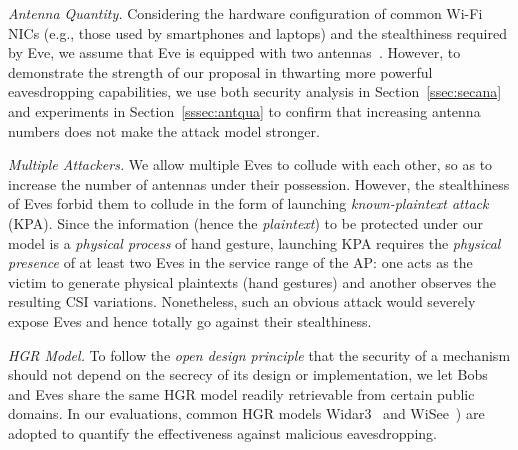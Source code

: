 \documentclass[conference,compsoc]{IEEEtran}
\newcommand{\newrev}[1]{{\color{blue}#1}}    %
\newcommand{\newrev}[1]{#1}
\begin{document}
\emph{Antenna Quantity.}
%
Considering the hardware configuration of common Wi-Fi NICs (e.g., those used by smartphones and laptops) and the stealthiness required by Eve, we assume that Eve is equipped with two antennas~\cite{AntennaNumber-TMC}. However, to demonstrate the strength of our proposal in thwarting more powerful eavesdropping capabilities, we use both security analysis in \newrev{Section~\ref{ssec:secana}} and experiments in Section~\ref{sssec:antqua} to confirm that increasing antenna numbers does not make the attack model stronger.

\emph{Multiple Attackers.} 
%
\newrev{We allow multiple Eves to collude with each other, so as to increase the number of antennas under their possession. However, the stealthiness of Eves forbid them to collude in the form of launching \textit{known-plaintext attack} (KPA). Since the information (hence the \textit{plaintext}) to be protected under our model is a \textit{physical process} of hand gesture, launching KPA requires the \textit{physical presence} of at least two Eves in the service range of the AP: one acts as the victim to generate physical plaintexts (hand gestures) and another observes the resulting CSI variations. Nonetheless, such an obvious attack would severely expose Eves and hence totally go against their stealthiness.}

\emph{HGR Model.} 
%
To follow the \textit{open design principle} that the security of a mechanism should not depend on the secrecy of its design or implementation, we let Bobs and Eves share the same HGR model readily retrievable from certain public domains. 
%
%
In our evaluations, common HGR models Widar3~\cite{Widar3-MobiSys19} and WiSee~\cite{WiSee-MobiCom13}) are adopted to quantify the effectiveness against malicious eavesdropping.
\end{document}
